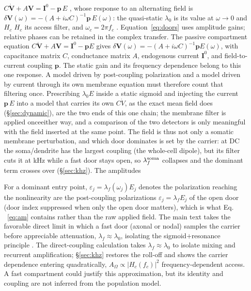 \documentclass[11pt,a4paper]{article}
\providecommand{\DIFaddtex}[1]{{\protect\color{blue} \sf #1}} %
\providecommand{\DIFdeltex}[1]{{\protect\color{red} \scriptsize #1}} %
\providecommand{\DIFaddbegin}{} %
\providecommand{\DIFaddend}{} %
\providecommand{\DIFdelbegin}{} %
\providecommand{\DIFdelend}{} %
\providecommand{\DIFadd}[1]{\texorpdfstring{\DIFaddtex{#1}}{#1}} %
\providecommand{\DIFdel}[1]{\texorpdfstring{\DIFdeltex{#1}}{}} %
\begin{document}
\DIFdelbegin \DIFdel{$C\dot{\mathbf V}+A\mathbf V=\mathbf I^0-\mathbf p\,E$
\cite{ruffini2021nmm2} , whose response to an alternating field is
$\delta\mathbf V(\omega)=-(A+i\omega C)^{-1}\mathbf p\,E(\omega)$: the quasi-static $\lambda_0$ is
its value at $\omega\to0$ and $H_c$ }\DIFdelend \DIFaddbegin \DIFadd{$H_c$ its access filter, and $\omega_c=2\pi f_c$
\cite{ruffini2025rosetta,galangadea2023}. Equation~\eqref{eq:doors} uses amplitude
gains; relative phases can be retained in the complex transfer. The passive
compartment equation $C\dot{\mathbf V}+A\mathbf V=\mathbf I^0-\mathbf pE$
\cite{ruffini2021nmm2} gives
$\delta\mathbf V(\omega)=-(A+i\omega C)^{-1}\mathbf pE(\omega)$, with capacitance
matrix $C$, conductance matrix $A$, endogenous current $\mathbf I^0$, and field-to-current
coupling $\mathbf p$. The static gain and }\DIFaddend its frequency dependence \DIFaddbegin \DIFadd{belong to this
one response. A model driven by post-coupling polarization and a model driven by
current through its own membrane equation must therefore count that filtering once}\DIFaddend .
\DIFdelbegin \DIFdel{Prescribing $\lambda_0E$ inside a
static sigmoid and injecting the current $\mathbf p\,E$ into a model that carries its own $C\dot V$, as the exact mean field does (\S\ref{sec:dynamic}), are the two ends of this one
chain; the membrane filter is applied onceeither way, and a comparison of the two detectors
is only meaningful with the field inserted at the same point.
The field is thus not only a somatic membrane perturbation, and which door
dominates is set by the
carrier: at DC the soma/dendrite has the largest coupling (the
whole-cell dipole), but its filter cuts it at kHz while a fast door stays open, so
$\lambda^{\rm soma}_f$ collapses and the dominant term crosses over (\S\ref{sec:khz}).
The amplitudes }\DIFdelend \DIFaddbegin

\DIFadd{For a dominant entry point, $\varepsilon_j=\lambda_f(\omega_j)E_j$ denotes the
polarization }\DIFaddend reaching the nonlinearity\DIFdelbegin \DIFdel{are the post-coupling polarizations
$\varepsilon_j=\lambda_f E_j$ of the open door (door index suppressed when only the open
door matters), which is what Eq. ~\eqref{eq:am} contains rather than the raw applied field. The main text takes
the favorable direct limit in
which a fast door (axonal or nodal) samples the carrier before appreciable
attenuation, $\lambda_f\!\approx\!\lambda_0$, isolating the sigmoid$+$resonance
principle}\DIFdelend \DIFaddbegin \DIFadd{. The direct-coupling calculation takes
$\lambda_f\approx\lambda_0$ to isolate mixing and recurrent amplification}\DIFaddend ;
\S\ref{sec:khz} restores \DIFdelbegin \DIFdel{the roll-off and shows the carrier dependence
entering quadratically, $A_\Omega\propto\lvert H_c(f_c)\rvert^2$}\DIFdelend \DIFaddbegin \DIFadd{frequency-dependent access. A fast compartment could
justify this approximation, but its identity and coupling are not inferred from
the population model}\DIFaddend .
\end{document}
